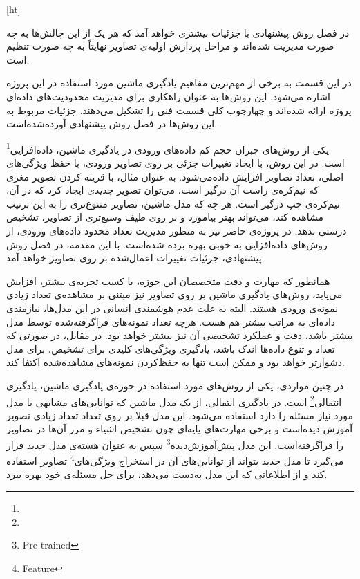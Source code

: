 [ht]


در فصل روش پیشنهادی با جزئیات بیشتری خواهد آمد که هر یک از این چالش‌ها به چه صورت مدیریت شده‌اند و مراحل پردازش اولیه‌ی تصاویر نهایتاً به چه صورت تنظیم است.


در این قسمت به برخی از مهم‌ترین مفاهیم یادگیری ماشین مورد استفاده در این پروژه اشاره می‌شود.
این روش‌ها به عنوان راهکاری برای مدیریت محدودیت‌های داده‌ای پروژه ارائه شده‌اند و چهارچوب کلی قسمت فنی را تشکیل می‌دهند.
جزئیات مربوط به این روش‌ها در فصل روش پیشنهادی آورده‌شده‌است.


یکی از روش‌های جبران حجم کم داده‌های ورودی در یادگیری ماشین، 
داده‌افزایی\footnote{}
 است.
در این روش، با ایجاد تغییرات جزئی بر روی تصاویر ورودی، با حفظ ویژگی‌های اصلی، تعداد تصاویر افزایش داده‌می‌شود.
به عنوان مثال، با قرینه کردن تصویر مغزی که نیم‌کره‌ی راست آن درگیر است، می‌‌توان تصویر جدیدی ایجاد کرد که در آن، نیم‌کره‌ی چپ درگیر است.
هر چه که مدل ماشین، تصاویر متنوع‌تری را به این ترتیب مشاهده کند، می‌تواند بهتر بیاموزد و بر روی طیف وسیع‌تری از تصاویر، تشخیص درستی بدهد.
در پروژه‌ی حاضر نیز به منظور مدیریت تعداد محدود داده‌های ورودی، از روش‌های داده‌افزایی به خوبی بهره برده شده‌است.
با این مقدمه، در فصل روش پیشنهادی، جزئیات تغییرات اعمال‌شده بر روی تصاویر خواهد آمد.


همانطور که مهارت و دقت متخصصان این حوزه، با کسب تجربه‌ی بیشتر، افزایش می‌یابد،
روش‌های یادگیری ماشین بر روی تصاویر نیز مبتنی بر مشاهده‌ی تعداد زیادی نمونه‌ی ورودی هستند.
البته به علت عدم هوشمندی انسانی در این مدل‌ها، نیازمندی داده‌ای به مراتب بیشتر هم هست.
هرچه تعداد نمونه‌های فراگرفته‌شده توسط مدل بیشتر باشد، دقت و عملکرد تشخیصی آن نیز بیشتر خواهد بود.
در مقابل، در صورتی که تعداد و تنوع داده‌ها اندک باشد، یادگیری ویژگی‌های کلیدی برای تشخیص، برای مدل دشوارتر خواهد بود و ممکن است تنها به حفظ‌کردن نمونه‌های مشاهده‌شده اکتفا کند.

در چنین مواردی، یکی از روش‌های مورد استفاده در حوزه‌ی یادگیری ماشین، 
یادگیری انتقالی\footnote{}
 است.
در یادگیری انتقالی، از یک مدل ماشین که توانایی‌های مشابهی با مدل مورد نیاز مسئله را دارد
استفاده می‌شود.
این مدل قبلا بر روی تعداد تعداد زیادی تصویر آموزش دیده‌است و برخی مهارت‌های پایه‌ای چون تشخیص اشیاء و مرز آن‌ها در تصاویر را فراگرفته‌است.
این مدل 
پیش‌آموزش‌دیده\footnote{Pre-trained}
سپس
به عنوان هسته‌ی مدل جدید قرار می‌گیرد تا مدل جدید بتواند از توانایی‌های آن در استخراج ویژگی‌های\footnote{Feature} تصاویر استفاده کند 
و از اطلاعاتی که این مدل به‌دست می‌دهد، برای حل مسئله‌ی خود بهره ببرد.

